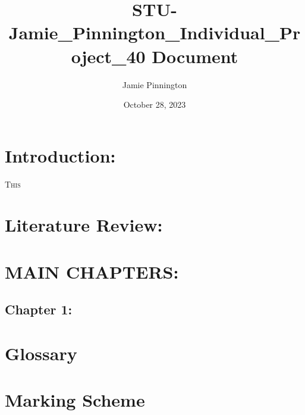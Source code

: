 \documentclass[preprint,12pt,review,authoryear]{elsarticle}
\title{STU-Jamie_Pinnington_Individual_Project_40 Document}
\author{Jamie Pinnington}
\date{October 28, 2023}
\begin{document}
\pagestyle{customStyle} %



\clearpage %

\begin{abstract}
\end{abstract}


\clearpage %

\tableofcontents
\clearpage %

\listoffigures
\clearpage %

\listoftables
\clearpage %

\section{Introduction:}

\lettrine[lines=2]{T}{his}



\section{Literature Review:}





\section{MAIN CHAPTERS:}
\subsection{Chapter 1:}

\newpage
\onecolumn
\section{Glossary}
\renewcommand{\thepage}{A\arabic{page}}
\newpage
\section{Marking Scheme}
\renewcommand{\thepage}{B\arabic{page}}
\newpage
\end{document}
